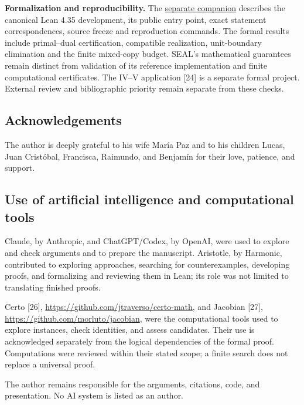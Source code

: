 \documentclass[english,11pt,a4paper]{article}
\begin{document}
\textbf{Formalization and reproducibility.} The
\href{https://github.com/jtraverso/erdos-81-chordal-clique-partitions/tree/main/preprints/PAPER_V/05_formalization}{separate
companion} describes the canonical Lean 4.35 development, its public
entry point, exact statement correspondences, source freeze and
reproduction commands. The formal results include primal--dual
certification, compatible realization, unit-boundary elimination and the
finite mixed-copy budget. SEAL's mathematical guarantees remain distinct
from validation of its reference implementation and finite computational
certificates. The IV--V application {[}24{]} is a separate formal
project. External review and bibliographic priority remain separate from
these checks.

\subsection{Acknowledgements}\label{acknowledgements}

The author is deeply grateful to his wife María Paz and to his children
Lucas, Juan Cristóbal, Francisca, Raimundo, and Benjamín for their love,
patience, and support.

\subsection{Use of artificial intelligence and computational
tools}\label{use-of-artificial-intelligence-and-computational-tools}

Claude, by Anthropic, and ChatGPT/Codex, by OpenAI, were used to explore
and check arguments and to prepare the manuscript. Aristotle, by
Harmonic, contributed to exploring approaches, searching for
counterexamples, developing proofs, and formalizing and reviewing them
in Lean; its role was not limited to translating finished proofs.

Certo {[}26{]}, \url{https://github.com/jtraverso/certo-math}, and
Jacobian {[}27{]}, \url{https://github.com/morluto/jacobian}, were the
computational tools used to explore instances, check identities, and
assess candidates. Their use is acknowledged separately from the logical
dependencies of the formal proof. Computations were reviewed within
their stated scope; a finite search does not replace a universal proof.

The author remains responsible for the arguments, citations, code, and
presentation. No AI system is listed as an author.

\begingroup\setlength{\parskip}{0pt}
\end{document}
